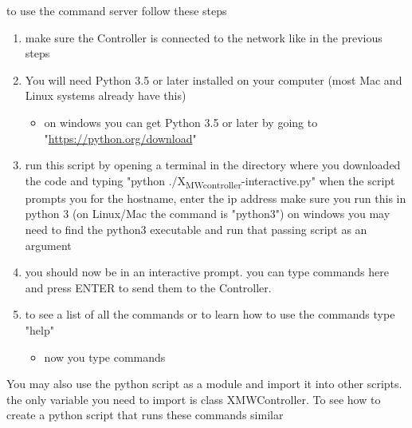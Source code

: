 \documentclass[11pt]{article}
\begin{document}
to use the command server follow these steps
\begin{enumerate}
\item make sure the Controller is connected to the network like in the previous steps
\item You will need Python 3.5 or later installed on your computer
(most Mac and Linux systems already have this)
\begin{itemize}
\item on windows you can get Python 3.5 or later by going to "\url{https://python.org/download}"
\end{itemize}
\item run this script by opening a terminal in the directory where you downloaded the code
and typing "python ./X\textsubscript{MWcontroller}-interactive.py" when the script prompts you for the hostname,
enter the ip address
make sure you run this in python 3 (on Linux/Mac the command is "python3") on windows
you may need to find the python3 executable and run that passing script as an argument
\item you should now be in an interactive prompt. you can type commands here and press ENTER
to send them to the Controller.
\item to see a list of all the commands or to learn how to use the commands type "help"
\begin{itemize}
\item now you type commands
\end{itemize}
\end{enumerate}

You may also use the python script as a module and import it into other scripts.
the only variable you need to import is class XMWController.
To see how to create a python script that runs these commands similar
\end{document}
